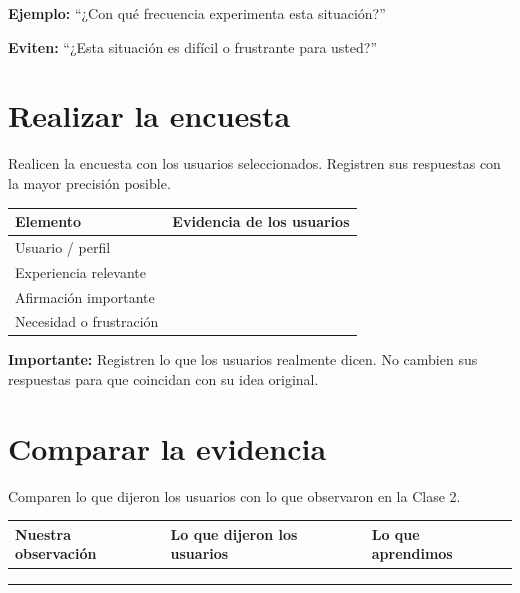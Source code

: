 \documentclass[12pt]{article}
\begin{document}
	\vspace{3mm}
	
	\textbf{Ejemplo:} ``¿Con qué frecuencia experimenta esta situación?''
	
	\textbf{Eviten:} ``¿Esta situación es difícil o frustrante para usted?''
	
	\section{Realizar la encuesta}
	
	Realicen la encuesta con los usuarios seleccionados. Registren sus respuestas con la mayor precisión posible.
	
	\begin{center}
		\small
		\begin{tabular}{|L{0.22\textwidth}|L{0.73\textwidth}|}
			\hline
			\textbf{Elemento} & \textbf{Evidencia de los usuarios} \\
			\hline
			Usuario / perfil & \rule{0pt}{0.5cm} \\
			\hline
			Experiencia relevante & \rule{0pt}{0.7cm} \\
			\hline
			Afirmación importante & \rule{0pt}{0.9cm} \\
			\hline
			Necesidad o frustración & \rule{0pt}{0.9cm} \\
			\hline
		\end{tabular}
	\end{center}
	
	\textbf{Importante:} Registren lo que los usuarios realmente dicen. No cambien sus respuestas para que coincidan con su idea original.
	
	\section{Comparar la evidencia}
	
	Comparen lo que dijeron los usuarios con lo que observaron en la Clase 2.
	\begin{center}
		\small
		\begin{tabular}{|L{0.3\textwidth}|L{0.3\textwidth}|L{0.3\textwidth}|}
			\hline
			\textbf{Nuestra observación} & \textbf{Lo que dijeron los usuarios} & \textbf{Lo que aprendimos} \\
			\hline
			\rule{0pt}{1.3cm} & \rule{0pt}{1.3cm} & \rule{0pt}{1.3cm} \\
			\hline
			\rule{0pt}{1.3cm} & \rule{0pt}{1.3cm} & \rule{0pt}{1.3cm} \\
			\hline
			\rule{0pt}{1.3cm} & \rule{0pt}{1.3cm} & \rule{0pt}{1.3cm} \\
			\hline
		\end{tabular}
	\end{center}
	
\end{document}
